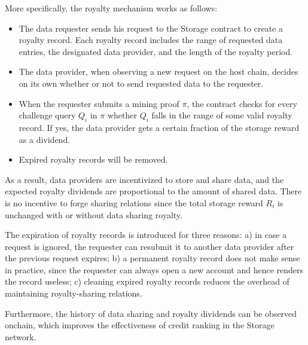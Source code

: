 More specifically, the royalty mechanism works as follows:
\begin{itemize}
 	\item The data requester sends his request to the \projabbrev Storage contract to create a royalty record. Each royalty record includes the range of requested data entries, the designated data provider, and the length of the royalty period.
 	
 	\item The data provider, when observing a new request on the host chain, decides on its own whether or not to send requested data to the requester.

 	\item When the requester submits a mining proof $\pi$, the \project contract checks for every \sproof challenge query $Q_i$  in $\pi$ whether $Q_i$ falls in the range of some valid royalty record.
 	If yes, the data provider gets a certain fraction of the storage reward as a dividend.


 	\item Expired royalty records will be removed.
\end{itemize}  

As a result, data providers are incentivized to store and share data,
and the expected royalty dividends are proportional to the amount of shared data.
There is no incentive to forge sharing relations since the total storage reward $R_i$ is unchanged with or without data sharing royalty.

The expiration of royalty records is introduced for three reasons: a) in case a request is ignored, the requester can resubmit it to another data provider after the previous request expires;
b) a permanent royalty record does not make sense in practice, since the requester can always open a new account and hence renders the record useless;
c) cleaning expired royalty records reduces the overhead of maintaining royalty-sharing relations.

Furthermore, the history of data sharing and royalty dividends can be observed onchain, which improves the effectiveness of credit ranking in the \projabbrev Storage network.






